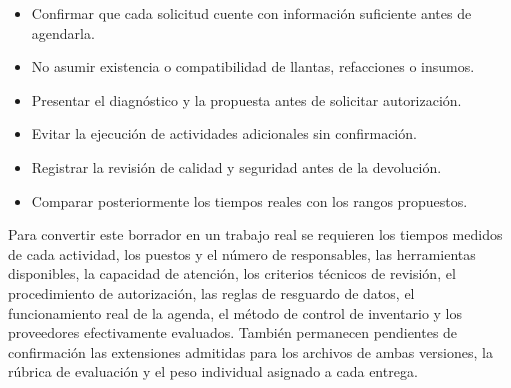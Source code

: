 \documentclass[12pt,letterpaper,oneside]{article}
\begin{document}
\begin{itemize}
\item Confirmar que cada solicitud cuente con información suficiente antes de agendarla.
\item No asumir existencia o compatibilidad de llantas, refacciones o insumos.
\item Presentar el diagnóstico y la propuesta antes de solicitar autorización.
\item Evitar la ejecución de actividades adicionales sin confirmación.
\item Registrar la revisión de calidad y seguridad antes de la devolución.
\item Comparar posteriormente los tiempos reales con los rangos propuestos.
\end{itemize}

Para convertir este borrador en un trabajo real se requieren los tiempos medidos de cada actividad, los puestos y el número de responsables, las herramientas disponibles, la capacidad de atención, los criterios técnicos de revisión, el procedimiento de autorización, las reglas de resguardo de datos, el funcionamiento real de la agenda, el método de control de inventario y los proveedores efectivamente evaluados. También permanecen pendientes de confirmación las extensiones admitidas para los archivos de ambas versiones, la rúbrica de evaluación y el peso individual asignado a cada entrega.
\clearpage
\printbibliography[title={Fuentes de consulta}]
\end{document}

